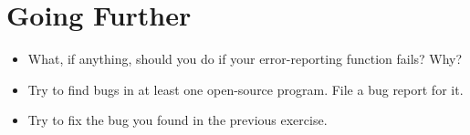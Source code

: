 \section{Going Further}

\begin{itemize}\item What, if anything, should you do if your error-reporting function fails?  Why? 
\item Try to find bugs in at least one open-source program.  File a bug report for it. 
\item Try to fix the bug you found in the previous exercise. 
\end{itemize}

